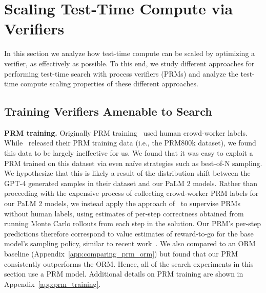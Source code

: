 \documentclass[11pt, letterpaper, logo]{googledeepmind}
\begin{document}
\vspace{-0.2cm}
\section{Scaling Test-Time Compute via Verifiers}
\label{sec:search}
\vspace{-0.2cm}
In this section we analyze how test-time compute can be scaled by optimizing a verifier, as effectively as possible. To this end, we study different approaches for performing test-time search with process verifiers (PRMs) and analyze the test-time compute scaling properties of these different approaches.

\vspace{-0.2cm}
\subsection{Training Verifiers Amenable to Search}
\vspace{-0.1cm}

\textbf{PRM training.} Originally PRM training~\citep{uesato2022solving,lightman2023lets} used human crowd-worker labels.
While~\citet{lightman2023lets} released their PRM training data (i.e., the PRM800k dataset), we found this data to be largely ineffective for us. We found that it was easy to exploit a PRM trained on this dataset via even na\"ive strategies such as best-of-N sampling. We hypothesize that this is likely a result of the distribution shift between the GPT-4 generated samples in their dataset and our PaLM 2 models.
Rather than proceeding with the expensive process of collecting crowd-worker PRM labels for our PaLM 2 models, we instead apply the approach of~\citet{wang2023mathshepherd} to supervise PRMs without human labels, using estimates of per-step correctness obtained from running Monte Carlo rollouts from each step in the solution.
Our PRM's per-step predictions therefore correspond to value estimates of reward-to-go for the base model's sampling policy, similar to recent work~\citep{wang2023mathshepherd,setlur2024rl}. We also compared to an ORM baseline (Appendix~\ref{app:comparing_prm_orm}) but found that our PRM consistently outperforms the ORM.
Hence, all of the search experiments in this section use a PRM model. Additional details on PRM training are shown in Appendix~\ref{app:prm_training}.
\end{document}
